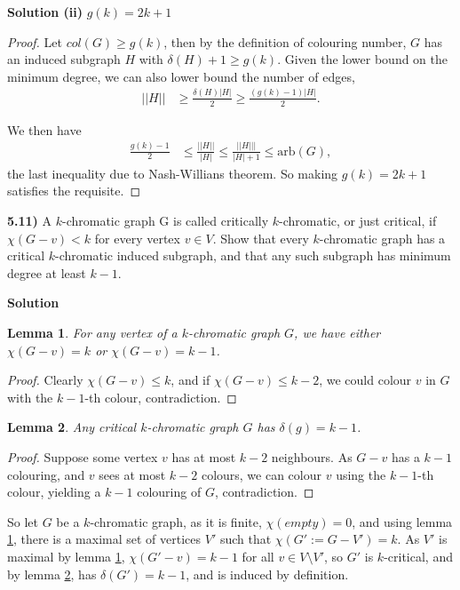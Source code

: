 \documentclass[11pt]{article}
\theoremstyle{plain}
\newtheorem{lemma}{Lemma}
\begin{document}
\noindent \textbf{Solution (ii)} $g(k)= 2k+1$

\begin{proof}
Let $col(G) \geq g(k)$, then by the definition of colouring number, $G$ has an induced subgraph $H$ with $\delta(H) + 1 \geq g(k)$. Given the lower bound on the minimum degree, we can also lower bound the number of edges,
\begin{align*}
||H|| & \geq \frac{\delta(H) |H|}{2} \geq \frac{(g(k) - 1)|H|}{2}.
\end{align*}

We then have
\begin{align*}
\frac{g(k) - 1}{2} & \leq \frac{||H||}{|H|}
\leq \frac{||H|||}{|H|+1}
\leq \text{arb}(G),
\end{align*}
the last inequality due to Nash-Willians theorem. So making $g(k) = 2k+1$ satisfies the requisite.
\end{proof}

\noindent \textbf{5.11)} A $k$-chromatic graph G is called critically $k$-chromatic, or just critical, if $\chi(G-v) < k$ for every vertex $v\in V$.
Show that every $k$-chromatic graph has a critical $k$-chromatic induced subgraph, and that any such subgraph has minimum degree at least $k-1$.

\vspace{.4cm}
\noindent \textbf{Solution} 

\begin{lemma} \label{lemma511_1}
For any vertex of a $k$-chromatic graph $G$, we have either $\chi(G-v) = k$ or $\chi(G-v)=k-1$. 
\end{lemma}
\begin{proof}
Clearly $\chi(G-v) \leq k$, and if $\chi(G-v) \leq k-2$, we could colour $v$ in $G$ with the $k-1$-th colour, contradiction.
\end{proof}

\begin{lemma} \label{lemma511_2}
Any critical $k$-chromatic graph $G$ has $\delta(g) = k-1$.
\end{lemma}
\begin{proof}
Suppose some vertex $v$ has at most $k-2$ neighbours. As $G-v$ has a $k-1$ colouring, and $v$ sees at most $k-2$ colours, we can colour $v$ using the $k-1$-th colour, yielding a $k-1$ colouring of $G$, contradiction. 
\end{proof}

So let $G$ be a $k$-chromatic graph, as it is finite, $\chi(empty)=0$, and using lemma \ref{lemma511_1}, there is a maximal set of vertices $V'$ such that $\chi(G':=G-V') = k$. As $V'$ is maximal by lemma \ref{lemma511_1}, $\chi(G'-v)=k-1$ for all $v\in V\setminus V'$, so $G'$ is $k$-critical, and by lemma \ref{lemma511_2}, has $\delta(G') = k-1$, and is induced by definition.
\end{document}
